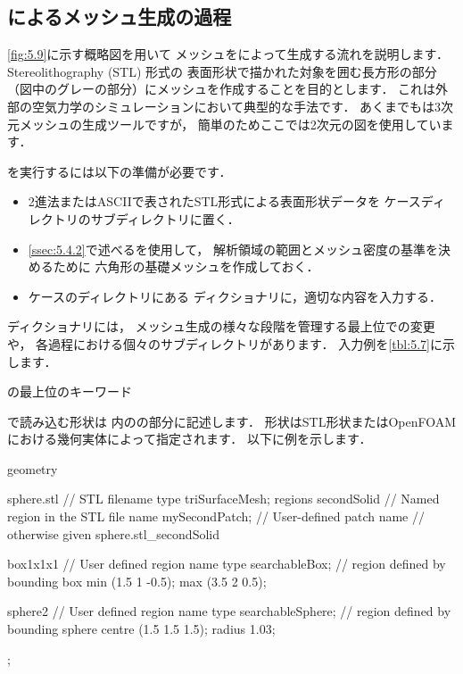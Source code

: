 \subsection{によるメッシュ生成の過程}
\label{ssec:5.4.1}
\autoref{fig:5.9}に示す概略図を用いて
メッシュをによって生成する流れを説明します．
%
Stereolithography (STL) 形式の
%
表面形状で描かれた対象を囲む長方形の部分
（図中のグレーの部分）にメッシュを作成することを目的とします．
これは外部の空気力学のシミュレーションにおいて典型的な手法です．
あくまでもは3次元メッシュの生成ツールですが，
簡単のためここでは2次元の図を使用しています．

を実行するには以下の準備が必要です．
\begin{itemize}
 \item 2進法またはASCIIで表されたSTL形式による表面形状データを
       ケースディレクトリのサブディレクトリに置く．
 \item \autoref{ssec:5.4.2}で述べるを使用して，
       解析領域の範囲とメッシュ密度の基準を決めるために
       六角形の基礎メッシュを作成しておく．
 \item ケースのディレクトリにある
%
%
       ディクショナリに，適切な内容を入力する．
\end{itemize}
ディクショナリには，
%
メッシュ生成の様々な段階を管理する最上位での変更や，
各過程における個々のサブディレクトリがあります．
入力例を\autoref{tbl:5.7}に示します．


\begin{table}[ht]
 
 \caption{の最上位のキーワード}
 \label{tbl:5.7}
\end{table}


で読み込む形状は
内のの部分に記述します．
形状はSTL形状またはOpenFOAMにおける幾何実体によって指定されます．
以下に例を示します．
\begin{OFverbatim}[file]
geometry
  {
      sphere.stl // STL filename
      {
          type triSurfaceMesh;
          regions
          {
              secondSolid             // Named region in the STL file
              {
                  name mySecondPatch; // User-defined patch name
              }                       // otherwise given sphere.stl_secondSolid
          }
      }

      box1x1x1  // User defined region name
      {
          type   searchableBox;       // region defined by bounding box
          min    (1.5 1 -0.5);
          max    (3.5 2 0.5);
      }

      sphere2  // User defined region name
      {
          type   searchableSphere;    // region defined by bounding sphere
          centre (1.5 1.5 1.5);
          radius 1.03;
      }
  };
\end{OFverbatim}


